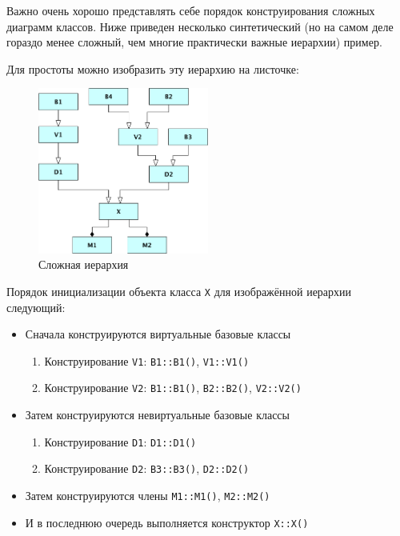 \documentclass[a4paper,12pt,oneside]{article}
\begin{document}
Важно очень хорошо представлять себе порядок конструирования сложных диаграмм классов. Ниже приведен несколько синтетический (но на самом деле гораздо менее сложный, чем многие практически важные иерархии) пример.



Для простоты можно изобразить эту иерархию на листочке:

\begin{figure}[h!]
\centering
\includegraphics[width=0.5\textwidth]{illustrations/complexhier-crop.pdf}
\caption{Сложная иерархия}
\label{fig:complexhier-crop}
\end{figure}

Порядок инициализации объекта класса \lstinline!X! для изображённой иерархии следующий:

\begin{itemize}
\item Сначала конструируются виртуальные базовые классы
  \begin{enumerate}
  \item Конструирование \lstinline!V1!: \lstinline!B1::B1()!, \lstinline!V1::V1()!
  \item Конструирование \lstinline!V2!: \lstinline!B1::B1()!, \lstinline!B2::B2()!, \lstinline!V2::V2()!
  \end{enumerate}
\item Затем конструируются невиртуальные базовые классы
  \begin{enumerate}
  \item Конструирование \lstinline!D1!: \lstinline!D1::D1()!
  \item Конструирование \lstinline!D2!: \lstinline!B3::B3()!, \lstinline!D2::D2()!
  \end{enumerate}
\item Затем конструируются члены \lstinline!M1::M1()!, \lstinline!M2::M2()!
\item И в последнюю очередь выполняется конструктор \lstinline!X::X()!
\end{itemize}
\end{document}

